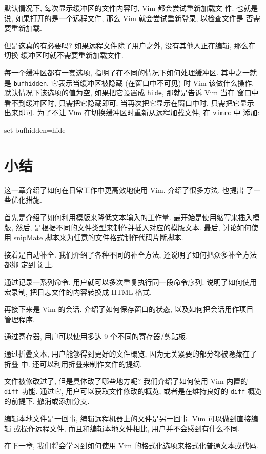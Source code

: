 默认情况下, 每次显示缓冲区的文件内容时, Vim 都会尝试重新加载文
件. 也就是说, 如果打开的是一个远程文件, 那么 Vim 就会尝试重新登录, 以检查文件是
否需要重新加载.

但是这真的有必要吗? 如果远程文件除了用户之外, 没有其他人正在编辑, 那么在切换
缓冲区时就不需要重新加载文件.

每一个缓冲区都有一套选项, 指明了在不同的情况下如何处理缓冲区. 其中之一就是
\texttt{bufhidden}, 它表示当缓冲区被隐藏 (在窗口中不可见) 时 Vim 该做什么操作.
默认情况下该选项的值为空, 如果把它设置成 \texttt{hide}, 那就是告诉 Vim 当在
窗口中看不到缓冲区时, 只需把它隐藏即可; 当再次把它显示在窗口中时, 只需把它显示
出来即可. 为了不让 Vim 在切换缓冲区时重新从远程加载文件, 在 \texttt{vimrc} 中
添加:
\begin{vimcode}
set bufhidden=hide
\end{vimcode}

\section{小结}
\label{sec:production_boosters_summary}

这一章介绍了如何在日常工作中更高效地使用 Vim. 介绍了很多方法, 也提出
了一些优化措施.

首先是介绍了如何利用模版来降低文本输入的工作量. 最开始是使用缩写来插入模版,
然后, 是根据不同的文件类型来制作并插入对应的模版文本. 最后, 讨论如何使用
snipMate 脚本来为任意的文件格式制作代码片断脚本.

接着是自动补全. 我们介绍了各种不同的补全方法, 还说明了如何把众多补全方法都绑
定到  键上.

通过记录一系列命令, 用户就可以多次重复执行同一段命令序列. 说明了如何使用
宏录制, 把日志文件的内容转换成 HTML 格式.

再接下来是 Vim 的会话. 介绍了如何保存窗口的状态, 以及如何把会话用作项目
管理程序.

通过寄存器, 用户可以使用多达 9 个不同的寄存器/剪贴板.

通过折叠文本, 用户能够得到更好的文件概览, 因为无关紧要的部分都被隐藏在了折叠
中. 还可以利用折叠来制作文件的提纲.

文件被修改过了, 但是具体改了哪些地方呢? 我们介绍了如何使用 Vim 内置的
\texttt{diff} 功能. 通过它, 用户可以获取文件修改的概览, 或者是在维持良好的
\texttt{diff} 概览的前提下, 撤消或添加分支.

编辑本地文件是一回事, 编辑远程机器上的文件是另一回事. Vim 可以做到直接编辑
或操作远程文件, 而且和编辑本地文件相比, 用户并不会感到有什么不同.

在下一章, 我们将会学习到如何使用 Vim 的格式化选项来格式化普通文本或代码.
